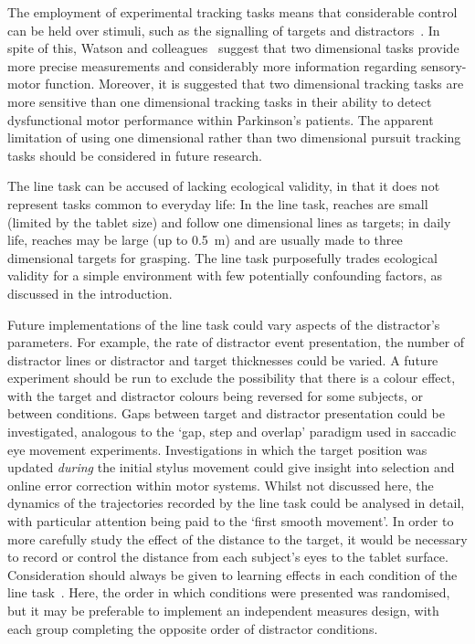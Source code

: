 \documentclass[10pt,letterpaper]{article}
\begin{document}
The employment of experimental tracking tasks means that considerable
control can be held over stimuli, such as the signalling of targets
and distractors~\cite{watson_two-dimensional_1997}. In spite of this,
Watson and colleagues~\cite{watson_two-dimensional_1997} suggest that
two dimensional tasks provide more precise measurements and
considerably more information regarding sensory-motor function.
Moreover, it is suggested that two dimensional tracking tasks are more
sensitive than one dimensional tracking tasks in their ability to
detect dysfunctional motor performance within Parkinson's
patients. The apparent limitation of using one dimensional
rather than two dimensional pursuit tracking tasks should be
considered in future research.

The line task can be accused of lacking ecological validity, in
that it does not represent tasks common to everyday life: In the line
task, reaches are small (limited by the tablet size) and follow one
dimensional lines as targets; in daily life, reaches may be large (up
to 0.5~m) and are usually made to three dimensional targets for
grasping. The line task purposefully trades ecological validity for a
simple environment with few potentially confounding factors, as
discussed in the introduction.

Future implementations of the line task could vary aspects of the
distractor's parameters. For example, the rate of distractor event
presentation, the number of distractor lines or distractor and target
thicknesses could be varied. A future experiment should be run to
exclude the possibility that there is a colour effect, with the target
and distractor colours being reversed for some subjects, or between
conditions. Gaps between target and distractor presentation could be
investigated, analogous to the `gap, step and overlap' paradigm used
in saccadic eye movement experiments. Investigations in which the
target position was updated \emph{during} the initial stylus movement
could give insight into selection and online error correction within
motor systems. Whilst not discussed here, the dynamics of the
trajectories recorded by the line task could be analysed in detail,
with particular attention being paid to the `first smooth
movement'. In order to more carefully study the effect of the distance
to the target, it would be necessary to record or control the distance
from each subject's eyes to the tablet surface. Consideration should
always be given to learning effects in each condition of the line
task~\cite{song_automatic_2007}. Here, the order in which conditions
were presented was randomised, but it may be preferable to implement
an independent measures design, with each group completing the
opposite order of distractor conditions.
\end{document}
